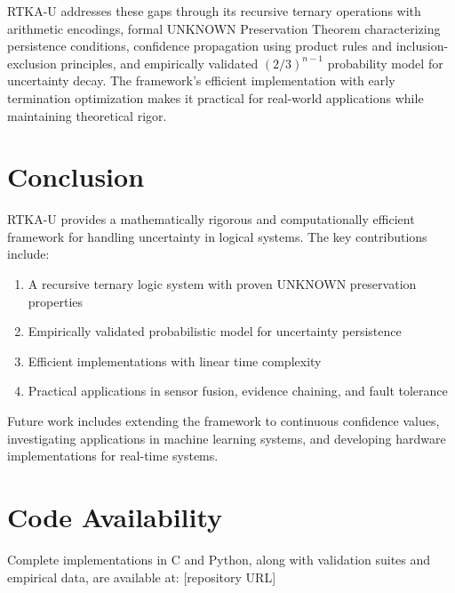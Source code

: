 \documentclass[11pt,a4paper]{article}
\begin{document}
RTKA-U addresses these gaps through its recursive ternary operations with arithmetic encodings, formal UNKNOWN Preservation Theorem characterizing persistence conditions, confidence propagation using product rules and inclusion-exclusion principles, and empirically validated $(2/3)^{n-1}$ probability model for uncertainty decay. The framework's efficient implementation with early termination optimization makes it practical for real-world applications while maintaining theoretical rigor.

\section{Conclusion}

RTKA-U provides a mathematically rigorous and computationally efficient framework for handling uncertainty in logical systems. The key contributions include:

\begin{enumerate}
\item A recursive ternary logic system with proven UNKNOWN preservation properties
\item Empirically validated probabilistic model for uncertainty persistence
\item Efficient implementations with linear time complexity
\item Practical applications in sensor fusion, evidence chaining, and fault tolerance
\end{enumerate}

Future work includes extending the framework to continuous confidence values, investigating applications in machine learning systems, and developing hardware implementations for real-time systems.

\section{Code Availability}

Complete implementations in C and Python, along with validation suites and empirical data, are available at: [repository URL]
\end{document}
